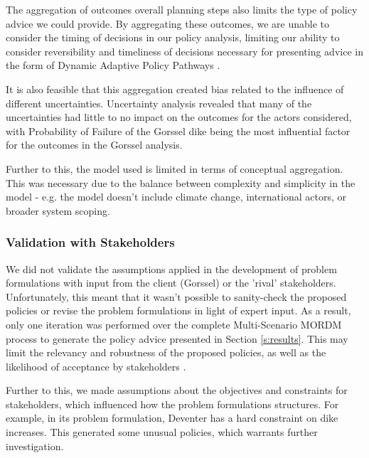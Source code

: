 The aggregation of outcomes overall planning steps also limits the type of policy advice we could provide. By aggregating these outcomes, we are unable to consider the timing of decisions in our policy analysis, limiting our ability to consider reversibility and timeliness of decisions necessary for presenting advice in the form of Dynamic Adaptive Policy Pathways \parencite{kwakkel_coping_2016, marchau_decision_2019}.

It is also feasible that this aggregation created bias related to the influence of different uncertainties. Uncertainty analysis revealed that many of the uncertainties had little to no impact on the outcomes for the actors considered, with Probability of Failure of the Gorssel dike being the most influential factor for the outcomes in the Gorssel analysis.

Further to this, the model used is limited in terms of conceptual aggregation. This was necessary due to the balance between complexity and simplicity in the model - e.g. the model doesn't include climate change, international actors, or broader system scoping.

\subsubsection{Validation with Stakeholders}
We did not validate the assumptions applied in the development of problem formulations with input from the client (Gorssel) or the 'rival' stakeholders. Unfortunately, this meant that it wasn't possible to sanity-check the proposed policies or revise the problem formulations in light of expert input. As a result, only one iteration was performed over the complete Multi-Scenario MORDM process to generate the policy advice presented in Section \ref{s:results}. This may limit the relevancy and robustness of the proposed policies, as well as the likelihood of acceptance by stakeholders \parencite{quinn_rival_2017}.

Further to this, we made assumptions about the objectives and constraints for stakeholders, which influenced how the problem formulations structures. For example, in its problem formulation, Deventer has a hard constraint on dike increases. This generated some unusual policies, which warrants further investigation.

